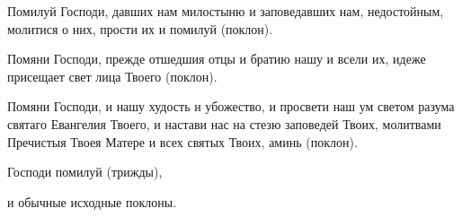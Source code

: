 Помилуй Господи, давших нам милостыню и заповедавших нам, недостойным, молитися о них, прости их и помилуй (поклон). 

Помяни Господи, прежде отшедшия отцы и братию нашу и всели их, идеже присещает свет лица Твоего (поклон). 

Помяни Господи, и нашу худость и убожество, и просвети наш ум светом разума святаго Евангелия Твоего, и настави нас на стезю заповедей Твоих, молитвами Пречистыя Твоея Матере и всех святых Твоих, аминь (поклон). 

Господи помилуй (трижды),

и обычные исходные поклоны.


\mychapterending